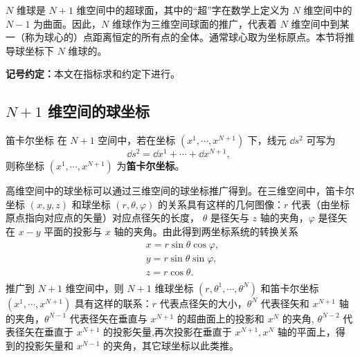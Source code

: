 
$N$ 维球是 $N+1$ 维空间中的超球面，其中的“超”字在数学上定义为 $N$ 维空间中的 $N-1$ 为曲面。因此，$N$ 维球作为三维空间球面的推广，代表着 $N$ 维空间中到某一（称为球心的）点距离恒定的所有点的全体。通常球心取为坐标原点。本节将推导球坐标下 $N$ 维球的。

\textbf{记号约定：}本文在指标求和约定下进行。

\subsection{$N+1$ 维空间的球坐标}
\begin{definition}{笛卡尔坐标}\label{def_nDSM_1}
在 $N+1$ 空间中，若在坐标 $(x^1,\cdots,x^{N+1})$ 下，线元 $\dd s^2$ 可写为
\begin{equation}\label{eq_nDSM_2}
\dd s^2=\dd x^1+\cdots+\dd x^{N+1},~
\end{equation}
 则称坐标 $(x^1,\cdots,x^{N+1})$ 为\textbf{笛卡尔坐标}。
\end{definition}

高维空间中的球坐标可以通过三维空间的球坐标推广得到。在三维空间中，笛卡尔坐标 $(x,y,z)$ 和球坐标 $(r,\theta,\varphi)$ 的关系具有这样的几何图像：$r$ 代表（由坐标原点指向对应点的矢量）对应点径矢的长度， $\theta$ 是径矢与 $z$ 轴的夹角，$\varphi$ 是径矢在 $x-y$ 平面的投影与 $x$ 轴的夹角。由此得到两坐标系统的转换关系
\begin{equation}
\begin{aligned}
&x=r\sin\theta\cos\varphi,\\
&y=r\sin\theta\sin\varphi,\\
&z=r\cos\theta.\\
\end{aligned}~
\end{equation}
推广到 $N+1$ 维空间中，则 $N+1$ 维球坐标 $(r,\theta^1,\cdots,\theta^{N})$ 和笛卡尔坐标 $(x^1,\cdots,x^{N+1})$ 具有这样的联系：$r$ 代表点径矢的大小，$\theta^{N}$ 代表径矢和 $x^{N+1}$ 轴的夹角，$\theta^{N-1}$ 代表径矢在垂直与 $x^{N+1}$ 的超曲面上的投影和 $x^{N}$ 的夹角, $\theta^{N-2}$ 代表径矢在垂直于 $x^{N+1}$ 的投影矢量,再次投影在垂直于 $x^{N+1},x^{N}$ 轴的平面上，得到的投影矢量和 $x^{N-1}$ 的夹角，其它球坐标以此类推。

